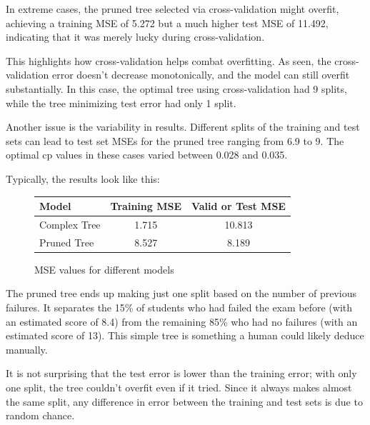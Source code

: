 \documentclass[12pt]{article}
\begin{document}
In extreme cases, the pruned tree selected via cross-validation might overfit, achieving a training MSE of 5.272 but a much higher test MSE of 11.492, indicating that it was merely lucky during cross-validation.

This highlights how cross-validation helps combat overfitting. As seen, the cross-validation error doesn't decrease monotonically, and the model can still overfit substantially. In this case, the optimal tree using cross-validation had 9 splits, while the tree minimizing test error had only 1 split.

Another issue is the variability in results. Different splits of the training and test sets can lead to test set MSEs for the pruned tree ranging from 6.9 to 9. The optimal \( \text{cp} \) values in these cases varied between 0.028 and 0.035.

Typically, the results look like this:

\begin{figure}
    \centering
    \begin{tabular}{| l | c | c |}
        \hline
        Model        & Training MSE & Valid or Test MSE \\
        \hline
        Complex Tree & 1.715        & 10.813            \\
        Pruned Tree  & 8.527        & 8.189             \\
        \hline
    \end{tabular}
    \caption{MSE values for different models}
\end{figure}



The pruned tree ends up making just one split based on the number of previous failures. It separates the 15\% of students who had failed the exam before (with an estimated score of 8.4) from the remaining 85\% who had no failures (with an estimated score of 13). This simple tree is something a human could likely deduce manually.

It is not surprising that the test error is lower than the training error; with only one split, the tree couldn’t overfit even if it tried. Since it always makes almost the same split, any difference in error between the training and test sets is due to random chance.
\end{document}
